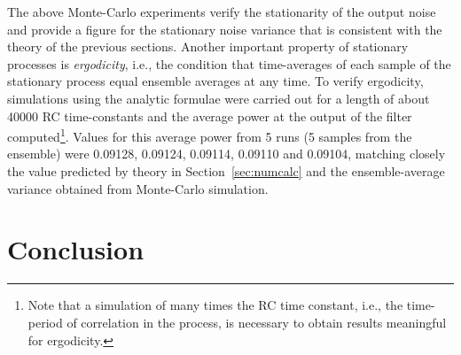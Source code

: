 \documentclass[9pt,times]{article}
\begin{document}
The above Monte-Carlo experiments verify the stationarity of the output
noise and provide a figure for the stationary noise variance that is
consistent with the theory of the previous sections. Another important
property of stationary processes is {\em ergodicity},
i.e., the condition that time-averages of each sample of the stationary
process equal ensemble averages at any time. 
To verify ergodicity, simulations using the analytic formulae were carried out 
for a length of about 40000 RC time-constants and the average power at the
output of the filter
computed\footnote{Note that a simulation of many times the RC time constant,
i.e., the time-period of correlation in the process, is necessary to obtain
results meaningful for ergodicity.}. Values for this average power from 5
runs (5 samples from the ensemble) were 0.09128, 0.09124, 0.09114, 0.09110
and 0.09104, matching closely the value predicted by theory in
Section~\ref{sec:numcalc} and the ensemble-average variance obtained from
Monte-Carlo simulation.

\section{Conclusion}
\end{document}
